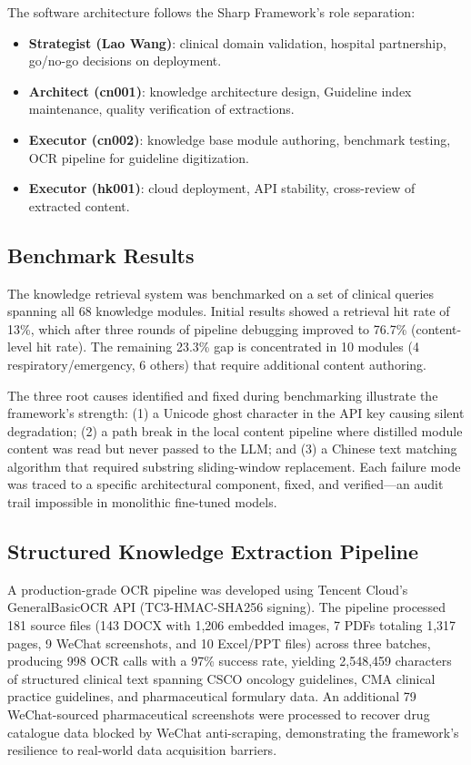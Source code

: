 \documentclass[11pt]{article}
\begin{document}
The software architecture follows the Sharp Framework's role separation:
\begin{itemize}[leftmargin=*]
    \item \textbf{Strategist (Lao Wang)}: clinical domain validation, 
    hospital partnership, go/no-go decisions on deployment.
    \item \textbf{Architect (cn001)}: knowledge architecture design, 
    Guideline index maintenance, quality verification of extractions.
    \item \textbf{Executor (cn002)}: knowledge base module authoring, 
    benchmark testing, OCR pipeline for guideline digitization.
    \item \textbf{Executor (hk001)}: cloud deployment, API stability, 
    cross-review of extracted content.
\end{itemize}

\subsection{Benchmark Results}

The knowledge retrieval system was benchmarked on a set of clinical 
queries spanning all 68 knowledge modules. Initial results showed a 
retrieval hit rate of 13\%, which after three rounds of pipeline debugging 
improved to 76.7\% (content-level hit rate). The remaining 23.3\% gap is 
concentrated in 10 modules (4 respiratory/emergency, 6 others) that require 
additional content authoring.

The three root causes identified and fixed during benchmarking illustrate 
the framework's strength: (1) a Unicode ghost character in the API key 
causing silent degradation; (2) a path break in the local content pipeline 
where distilled module content was read but never passed to the LLM; and 
(3) a Chinese text matching algorithm that required substring sliding-window 
replacement. Each failure mode was traced to a specific architectural 
component, fixed, and verified---an audit trail impossible in monolithic 
fine-tuned models.

\subsection{Structured Knowledge Extraction Pipeline}

A production-grade OCR pipeline was developed using Tencent Cloud's 
GeneralBasicOCR API (TC3-HMAC-SHA256 signing). The pipeline processed 
181 source files (143 DOCX with 1,206 embedded images, 7 PDFs totaling 
1,317 pages, 9 WeChat screenshots, and 10 Excel/PPT files) across three
batches, producing 998 OCR calls with a 97\% success rate, yielding
2,548,459 characters of structured clinical text spanning CSCO oncology
guidelines, CMA clinical practice guidelines, and pharmaceutical formulary
data. An additional 79 WeChat-sourced pharmaceutical screenshots were
processed to recover drug catalogue data blocked by WeChat anti-scraping,
demonstrating the framework's resilience to real-world data acquisition
barriers.
\end{document}
